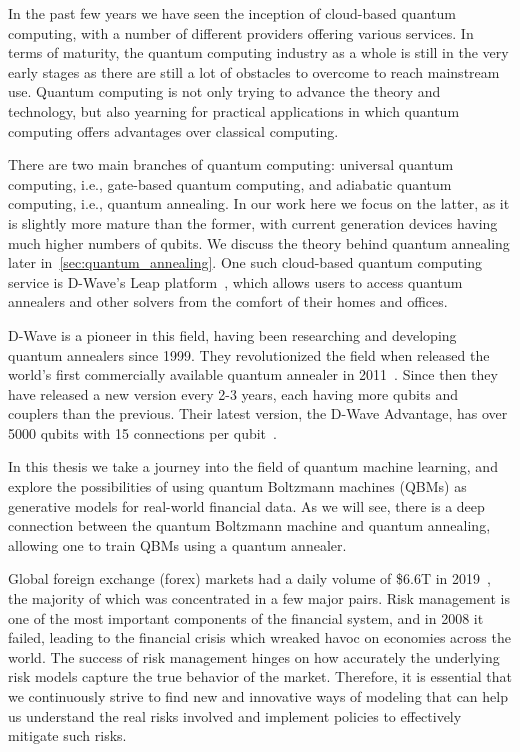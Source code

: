 In the past few years we have seen the inception of cloud-based quantum computing, with a number of different providers offering various services.
In terms of maturity, the quantum computing industry as a whole is still in the very early stages as there are still a lot of obstacles to overcome to reach mainstream use.
Quantum computing is not only trying to advance the theory and technology, but also yearning for practical applications in which quantum computing offers advantages over classical computing.

There are two main branches of quantum computing: universal quantum computing, i.e., gate-based quantum computing, and adiabatic quantum computing, i.e., quantum annealing.
In our work here we focus on the latter, as it is slightly more mature than the former, with current generation devices having much higher numbers of qubits.
We discuss the theory behind quantum annealing later in~\cref{sec:quantum_annealing}.
One such cloud-based quantum computing service is D-Wave's Leap platform~\cite{dwave_leap}, which allows users to access quantum annealers and other solvers from the comfort of their homes and offices.

D-Wave is a pioneer in this field, having been researching and developing quantum annealers since 1999.
They revolutionized the field when released the world's first commercially available quantum annealer in 2011~\cite{zyga_2011}.
Since then they have released a new version every 2-3 years, each having more qubits and couplers than the previous.
Their latest version, the D-Wave Advantage, has over 5000 qubits with 15 connections per qubit~\cite{dwave_advantage}.

In this thesis we take a journey into the field of quantum machine learning, and explore the possibilities of using quantum Boltzmann machines (QBMs) as generative models for real-world financial data.
As we will see, there is a deep connection between the quantum Boltzmann machine and quantum annealing, allowing one to train QBMs using a quantum annealer.

Global foreign exchange (forex) markets had a daily volume of \$6.6T in 2019~\cite{bis_2019}, the majority of which was concentrated in a few major pairs.
Risk management is one of the most important components of the financial system, and in 2008 it failed, leading to the financial crisis which wreaked havoc on economies across the world.
The success of risk management hinges on how accurately the underlying risk models capture the true behavior of the market.
Therefore, it is essential that we continuously strive to find new and innovative ways of modeling that can help us understand the real risks involved and implement policies to effectively mitigate such risks.

